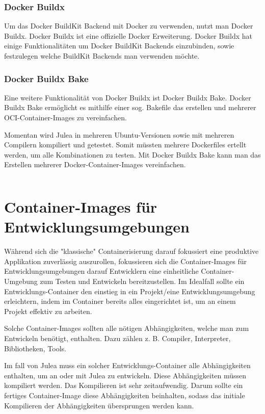 \subsubsection{Docker Buildx}

Um das Docker BuildKit Backend mit Docker zu verwenden, nutzt man Docker Buildx. Docker Buildx ist eine offizielle Docker Erweiterung. Docker Buildx hat einige Funktionalitäten um Docker BuildKit Backends einzubinden, sowie festzulegen welche BuildKit Backends man verwenden möchte.

\subsubsection{Docker Buildx Bake}

Eine weitere Funktionalität von Docker Buildx ist Docker Buildx Bake. Docker Buildx Bake ermöglicht es mithilfe einer sog. Bakefile das erstellen und mehrerer OCI-Container-Images zu vereinfachen.

Momentan wird Julea in mehreren Ubuntu-Versionen sowie mit mehreren Compilern kompiliert und getestet. Somit müssten mehrere Dockerfiles ertellt werden, um alle Kombinationen zu testen. Mit Docker Buildx Bake kann man das Erstellen mehrerer Docker-Container-Images vereinfachen.

\inputminted{./lexers/docker-bake-lexer.py}{./code-examples/docker-bake.example.hcl}

\section{Container-Images für Entwicklungsumgebungen}

Während sich die "klassische" Containerisierung darauf fokussiert eine produktive Applikation zuverlässig auszurollen, fokussieren sich die Container-Images für Entwicklungsumgebungen darauf Entwicklern eine einheitliche Container-Umgebung zum Testen und Entwickeln bereitzustellen. Im Idealfall sollte ein Entwicklungs-Container den einstieg in ein Projekt/eine Entwicklungsumgebung erleichtern, indem im Container bereits alles eingerichtet ist, um an einem Projekt effektiv zu arbeiten.

Solche Container-Images sollten alle nötigen Abhängigkeiten, welche man zum Entwickeln benötigt, enthalten. Dazu zählen z. B. Compiler, Interpreter, Bibliotheken, Tools.

Im fall von Julea muss ein solcher Entwicklungs-Container alle Abhängigkeiten enthalten, um an oder mit Julea zu entwickeln. Diese Abhängigkeiten müssen kompiliert werden. Das Kompilieren ist sehr zeitaufwendig. Darum sollte ein fertiges Container-Image diese Abhängigkeiten beinhalten, sodass das initiale Kompilieren der Abhängigkeiten übersprungen werden kann.

